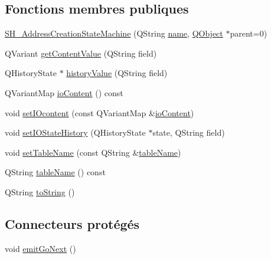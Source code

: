 \subsection*{Fonctions membres publiques}
\begin{DoxyCompactItemize}
\item 
\hyperlink{classSH__AddressCreationStateMachine_aabbda0fa01d5a59aaff1bd0e7153386d}{S\-H\-\_\-\-Address\-Creation\-State\-Machine} (Q\-String \hyperlink{classSH__NamedObject_a9f686c6f2a5bcc08ad03d0cee0151f0f}{name}, \hyperlink{classQObject}{Q\-Object} $\ast$parent=0)
\item 
Q\-Variant \hyperlink{classSH__InOutStateMachine_aa1a3bd3c0ea8a59b9bc916dc718eb9ca}{get\-Content\-Value} (Q\-String field)
\item 
Q\-History\-State $\ast$ \hyperlink{classSH__InOutStateMachine_af71bfdb3b59b7bf2763588b513b4205f}{history\-Value} (Q\-String field)
\item 
Q\-Variant\-Map \hyperlink{classSH__InOutStateMachine_aaca105fbd5f5cc3bac115389ad3694c5}{io\-Content} () const 
\item 
void \hyperlink{classSH__InOutStateMachine_a8271a7ec7d5f6502449dd3b4da5f4155}{set\-I\-Ocontent} (const Q\-Variant\-Map \&\hyperlink{classSH__InOutStateMachine_aaca105fbd5f5cc3bac115389ad3694c5}{io\-Content})
\item 
void \hyperlink{classSH__InOutStateMachine_acbcce2c4300af1634d928b30e5e9be1c}{set\-I\-O\-State\-History} (Q\-History\-State $\ast$state, Q\-String field)
\item 
void \hyperlink{classSH__InOutStateMachine_a95db31a7e7f31f36a8737adc739ab08c}{set\-Table\-Name} (const Q\-String \&\hyperlink{classSH__InOutStateMachine_a4288a6c86ddf83effefff886675591c9}{table\-Name})
\item 
Q\-String \hyperlink{classSH__InOutStateMachine_a4288a6c86ddf83effefff886675591c9}{table\-Name} () const 
\item 
Q\-String \hyperlink{classSH__GenericStateMachine_a85c0c1c9d258ae991f84667412fa47cd}{to\-String} ()
\end{DoxyCompactItemize}
\subsection*{Connecteurs protégés}
\begin{DoxyCompactItemize}
\item 
void \hyperlink{classSH__GenericStateMachine_a2e162a1da1f694d433cb9072b37ac530}{emit\-Go\-Next} ()
\end{DoxyCompactItemize}
